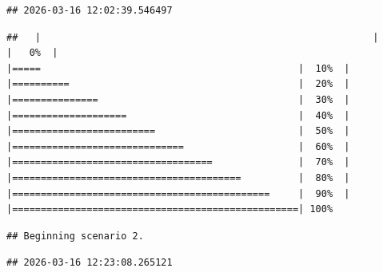 \documentclass[
]{article}
\begin{document}
\begin{verbatim}
## 2026-03-16 12:02:39.546497
\end{verbatim}

\begin{verbatim}
##   |                                                          |                                                  |   0%  |                                                          |=====                                             |  10%  |                                                          |==========                                        |  20%  |                                                          |===============                                   |  30%  |                                                          |====================                              |  40%  |                                                          |=========================                         |  50%  |                                                          |==============================                    |  60%  |                                                          |===================================               |  70%  |                                                          |========================================          |  80%  |                                                          |=============================================     |  90%  |                                                          |==================================================| 100%
\end{verbatim}

\begin{verbatim}
## Beginning scenario 2.
\end{verbatim}

\begin{verbatim}
## 2026-03-16 12:23:08.265121
\end{verbatim}
\end{document}
